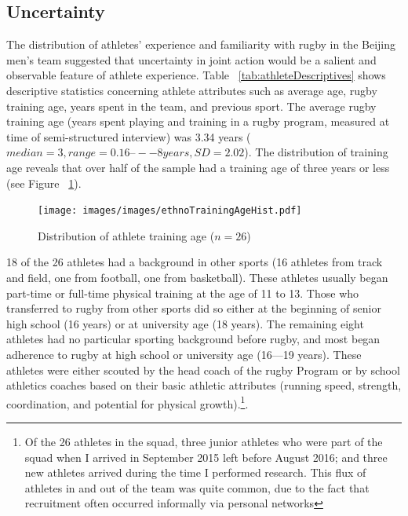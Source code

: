 \begin{CJK}{UTF8}{gbsn}
\section{Uncertainty}
The distribution of athletes' experience and familiarity with rugby in the Beijing men's team suggested that uncertainty in joint action would be a salient and observable feature of athlete experience.  Table ~\ref{tab:athleteDescriptives} shows descriptive statistics concerning athlete attributes such as average age, rugby training age, years spent in the team, and previous sport.  The average rugby training age (years spent playing and training in a rugby program, measured at time of semi-structured interview) was 3.34 years ($median = 3, range = 0.16 –-- 8 years, SD = 2.02$).  The distribution of training age reveals that over half of the sample had a training age of three years or less (see Figure ~\ref{fig:ethnoTrainingAgeHist}).

    \begin{figure}[htbp]
     \begin{center}
     \texttt{[image: images/images/ethnoTrainingAgeHist.pdf]}
       \caption{Distribution of athlete training age ($n = 26$)}
     \end{center}
       \label{fig:ethnoTrainingAgeHist}
    \end{figure}

18 of the 26 athletes had a background in other sports (16 athletes from track and field, one from football, one from basketball).  These athletes usually began part-time or full-time physical training at the age of 11 to 13.  Those who transferred to rugby from other sports did so either at the beginning of senior high school (16 years) or at university age (18 years).  The remaining eight athletes had no particular sporting background before rugby, and most began adherence to rugby at high school or university age (16---19 years).  These athletes were either scouted by the head coach of the rugby Program or by school athletics coaches based on their basic athletic attributes (running speed, strength, coordination, and potential for physical growth).\footnote{Of the 26 athletes in the squad, three junior athletes who were part of the squad when I arrived in September 2015 left before August 2016; and three new athletes arrived during the time I performed research.  This flux of athletes in and out of the team was quite common, due to the fact that recruitment often occurred informally via personal networks}.


\end{CJK}
